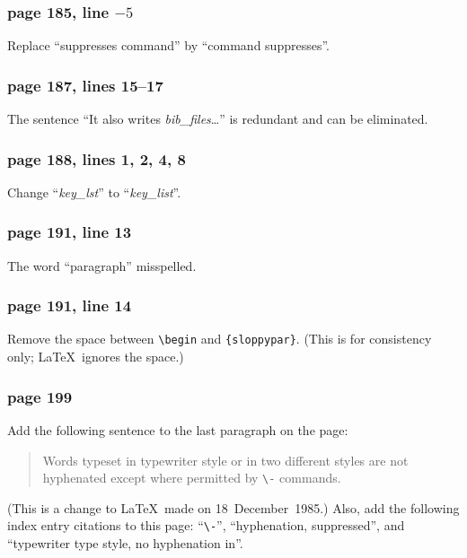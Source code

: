  
\subsubsection*{page 185, line $-5$}
Replace ``suppresses command'' by ``command suppresses''.
 
\subsubsection*{page 187, lines 15--17}
The sentence ``It also writes {\em bib\_files\/}\ldots'' is
redundant and can be eliminated.
 
\subsubsection*{page 188, lines 1, 2, 4, 8} 
Change ``{\em key\_lst\/}'' to ``{\em key\_list\/}''.
 
\subsubsection*{page 191, line 13} 
The word ``paragraph'' misspelled.
 
\subsubsection*{page 191, line 14}
Remove the space between \verb|\begin| and \verb|{sloppypar}|.
(This is for consistency only; \LaTeX\ ignores the space.)
 
\subsubsection*{page 199}
Add the following sentence to the last paragraph on the page:
\begin{quote}
Words typeset in typewriter style or in two different styles
are not hyphenated except where permitted by \verb|\-| commands.
\end{quote}
(This is a change to \LaTeX\ made on 18~December~1985.) Also, add the
following index entry citations to this page: ``\verb|\-|'',
``hyphenation, suppressed'', and ``typewriter type style, no
hyphenation in''.
 
